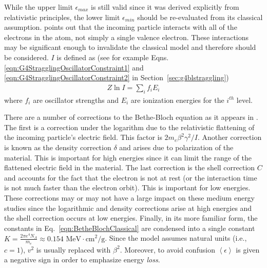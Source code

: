 While the upper limit $\epsilon_{max}$ is still valid since it was derived explicitly from relativistic principles, the lower limit $\epsilon_{min}$ should be re-evaluated from its classical assumption. \cite{bichsel1968} points out that the incoming particle interacts with all of the electrons in the atom, not simply a single valence electron. These interactions may be significant enough to invalidate the classical model and therefore should be considered. $I$ is defined as (see for example Eqns. \ref{eqn:G4StragglingOscillatorConstraint1} and \ref{eqn:G4StragglingOscillatorConstraint2} in Section~\ref{sec:g4blstraggling})
\begin{gather*}
Z \ln I = \sum_i f_i E_i
\end{gather*}
where $f_i$ are oscillator strengths and $E_i$ are ionization energies for the $i^{th}$ level.
\fi

There are a number of corrections to the Bethe-Bloch equation as it appears in \cite{cosy}. The first is a correction under the logarithm due to the relativistic flattening of the incoming particle's electric field. This factor is  $2m_e \beta^2 \gamma^2 / I$\cite{cosy}. Another correction is known as the density correction $\delta$ and arises due to polarization of the material\cite{cosy}. This is important for high energies since it can limit the range of the flattened electric field in the material. The last correction is the shell correction $C$ and accounts for the fact that the electron is not at rest (or the interaction time is not much faster than the electron orbit)\cite{cosy}. This is important for low energies. These corrections may or may not have a large impact on these medium energy studies since the logarithmic and density corrections arise at high energies and the shell correction occurs at low energies. Finally, in its more familiar form, the constants in Eq.~\eqref{eqn:BetheBlochClassical} are condensed into a single constant $K=\frac{2\pi e^4 N_A}{m_e}\approx 0.154$ $ \text{MeV}\cdot \text{cm}^2/\text{g}$. Since the model assumes natural units (i.e., $c=1$), $v^2$ is usually replaced with $\beta ^2$. Moreover, to avoid confusion $\left<\epsilon\right>$ is given a negative sign in order to emphasize energy \emph{loss}.


